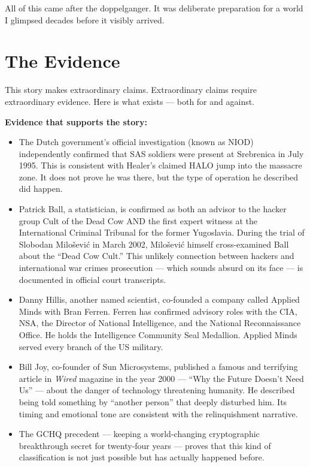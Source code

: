 All of this came after the doppelganger. It was deliberate preparation for a world I glimpsed decades before it visibly arrived.


\section*{The Evidence}
\label{record:tq-the-evidence}

This story makes extraordinary claims. Extraordinary claims require extraordinary evidence. Here is what exists --- both for and against.

\vspace{0.3cm}

\textbf{Evidence that supports the story:}

\begin{itemize}
\item The Dutch government's official investigation (known as NIOD) independently confirmed that SAS soldiers were present at Srebrenica in July 1995. This is consistent with Healer's claimed HALO jump into the massacre zone. It does not prove he was there, but the type of operation he described did happen.
\item Patrick Ball, a statistician, is confirmed as both an advisor to the hacker group Cult of the Dead Cow AND the first expert witness at the International Criminal Tribunal for the former Yugoslavia. During the trial of Slobodan Milošević in March 2002, Milošević himself cross-examined Ball about the ``Dead Cow Cult.'' This unlikely connection between hackers and international war crimes prosecution --- which sounds absurd on its face --- is documented in official court transcripts.
\item Danny Hillis, another named scientist, co-founded a company called Applied Minds with Bran Ferren. Ferren has confirmed advisory roles with the CIA, NSA, the Director of National Intelligence, and the National Reconnaissance Office. He holds the Intelligence Community Seal Medallion. Applied Minds served every branch of the US military.
\item Bill Joy, co-founder of Sun Microsystems, published a famous and terrifying article in \textit{Wired} magazine in the year 2000 --- ``Why the Future Doesn't Need Us'' --- about the danger of technology threatening humanity. He described being told something by ``another person'' that deeply disturbed him. Its timing and emotional tone are consistent with the relinquishment narrative.
\item The GCHQ precedent --- keeping a world-changing cryptographic breakthrough secret for twenty-four years --- proves that this kind of classification is not just possible but has actually happened before.
\end{itemize}

